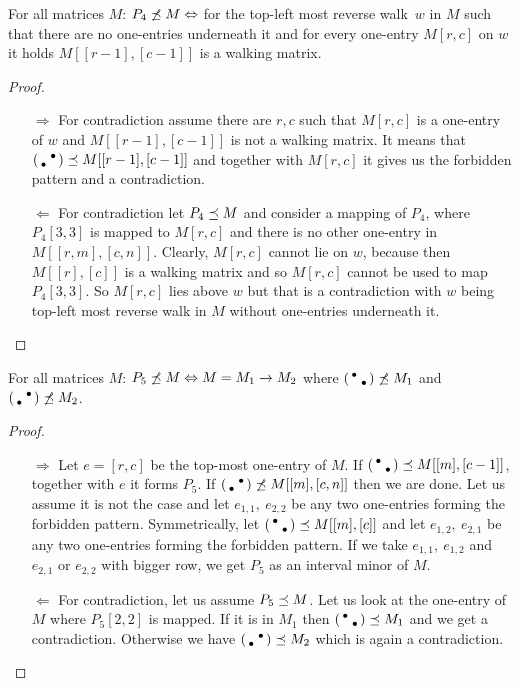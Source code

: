\begin{thm}
For all matrices $M$: $P_4\not\preceq M\Leftrightarrow$ for the top-left most reverse walk~$w$ in $M$ such that there are no one-entries underneath it and for every one-entry $M[r,c]$ on $w$ it holds $M[[r-1],[c-1]]$ is a walking matrix.
\end{thm}
\begin{proof}
\begin{itemize}
	\item[$\Rightarrow$] For contradiction assume there are $r,c$ such that $M[r,c]$ is a one-entry of $w$ and $M[[r-1],[c-1]]$ is not a walking matrix. It means that $\left(\begin{smallmatrix} &\bullet\\\bullet& \end{smallmatrix}\right)\preceq M[[r-1],[c-1]]$ and together with $M[r,c]$ it gives us the forbidden pattern and a contradiction.
	\item[$\Leftarrow$] For contradiction let $P_4\preceq M$ and consider a mapping of $P_4$, where $P_4[3,3]$ is mapped to $M[r,c]$ and there is no other one-entry in $M[[r,m],[c,n]]$. Clearly, $M[r,c]$ cannot lie on $w$, because then $M[[r],[c]]$ is a walking matrix and so $M[r,c]$ cannot be used to map $P_4[3,3]$. So $M[r,c]$ lies above $w$ but that is a contradiction with $w$ being top-left most reverse walk in $M$ without one-entries underneath it.
\end{itemize}
\end{proof}

\begin{thm}
For all matrices $M$: $P_5\not\preceq M\Leftrightarrow M=M_1\rightarrow M_2$ where $\left(\begin{smallmatrix}\bullet& \\ &\bullet\end{smallmatrix}\right)\not\preceq M_1$ and $\left(\begin{smallmatrix} &\bullet\\\bullet& \end{smallmatrix}\right)\not\preceq M_2$.
\end{thm}
\begin{proof}
\begin{itemize}
	\item[$\Rightarrow$] Let $e=[r,c]$ be the top-most one-entry of $M$. If $\left(\begin{smallmatrix}\bullet& \\ &\bullet\end{smallmatrix}\right)\preceq M[[m],[c-1]]$, together with $e$ it forms $P_5$. If $\left(\begin{smallmatrix} &\bullet\\\bullet& \end{smallmatrix}\right)\not\preceq M[[m],[c,n]]$ then we are done. Let us assume it is not the case and let $e_{1,1},\ e_{2,2}$ be any two one-entries forming the forbidden pattern. Symmetrically, let $\left(\begin{smallmatrix}\bullet& \\ &\bullet\end{smallmatrix}\right)\preceq M[[m],[c]]$ and let $e_{1,2},\ e_{2,1}$ be any two one-entries forming the forbidden pattern. If we take $e_{1,1},\ e_{1,2}$ and $e_{2,1}$ or $e_{2,2}$ with bigger row, we get $P_5$ as an interval minor of $M$. 
	\item[$\Leftarrow$] For contradiction, let us assume $P_5\preceq M$. Let us look at the one-entry of $M$ where $P_5[2,2]$ is mapped. If it is in $M_1$ then $\left(\begin{smallmatrix}\bullet& \\ &\bullet\end{smallmatrix}\right)\preceq M_1$ and we get a contradiction. Otherwise we have $\left(\begin{smallmatrix} &\bullet\\\bullet& \end{smallmatrix}\right)\preceq M_2$ which is again a contradiction.
\end{itemize}
\end{proof}


